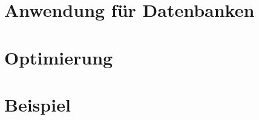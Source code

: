 \section{Anwendung für Datenbanken}

\section{Optimierung}
\cite{miner2012mapreduce}
\section{Beispiel}